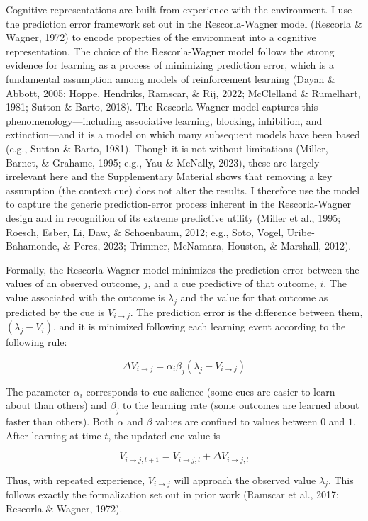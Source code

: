 \documentclass[
  man,floatsintext]{apa6}
\begin{document}
Cognitive representations are built from experience with the environment. I use the prediction error framework set out in the Rescorla-Wagner model (Rescorla \& Wagner, 1972) to encode properties of the environment into a cognitive representation. The choice of the Rescorla-Wagner model follows the strong evidence for learning as a process of minimizing prediction error, which is a fundamental assumption among models of reinforcement learning (Dayan \& Abbott, 2005; Hoppe, Hendriks, Ramscar, \& Rij, 2022; McClelland \& Rumelhart, 1981; Sutton \& Barto, 2018). The Rescorla-Wagner model captures this phenomenology---including associative learning, blocking, inhibition, and extinction---and it is a model on which many subsequent models have been based (e.g., Sutton \& Barto, 1981). Though it is not without limitations (Miller, Barnet, \& Grahame, 1995; e.g., Yau \& McNally, 2023), these are largely irrelevant here and the Supplementary Material shows that removing a key assumption (the context cue) does not alter the results. I therefore use the model to capture the generic prediction-error process inherent in the Rescorla-Wagner design and in recognition of its extreme predictive utility (Miller et al., 1995; Roesch, Esber, Li, Daw, \& Schoenbaum, 2012; e.g., Soto, Vogel, Uribe-Bahamonde, \& Perez, 2023; Trimmer, McNamara, Houston, \& Marshall, 2012).

Formally, the Rescorla-Wagner model minimizes the prediction error between the values of an observed outcome, \(j\), and a cue predictive of that outcome, \(i\). The value associated with the outcome is \(\lambda_j\) and the value for that outcome as predicted by the cue is \(V_{i \rightarrow j}\). The prediction error is the difference between them, \((\lambda_j-V_i)\), and it is minimized following each learning event according to the following rule:

\[
\Delta V_{i \rightarrow j} = \alpha_i \beta_j (\lambda_{j} - V_{i \rightarrow j})
\]

The parameter \(\alpha_i\) corresponds to cue salience (some cues are easier to learn about than others) and \(\beta_j\) to the learning rate (some outcomes are learned about faster than others). Both \(\alpha\) and \(\beta\) values are confined to values between \(0\) and \(1\). After learning at time \(t\), the updated cue value is

\[
V_{i \rightarrow j, t+1} = V_{i \rightarrow j, t} + \Delta V_{i \rightarrow j, t}
\]

Thus, with repeated experience, \(V_{i \rightarrow j}\) will approach the observed value \(\lambda_j\). This follows exactly the formalization set out in prior work (Ramscar et al., 2017; Rescorla \& Wagner, 1972).
\end{document}
